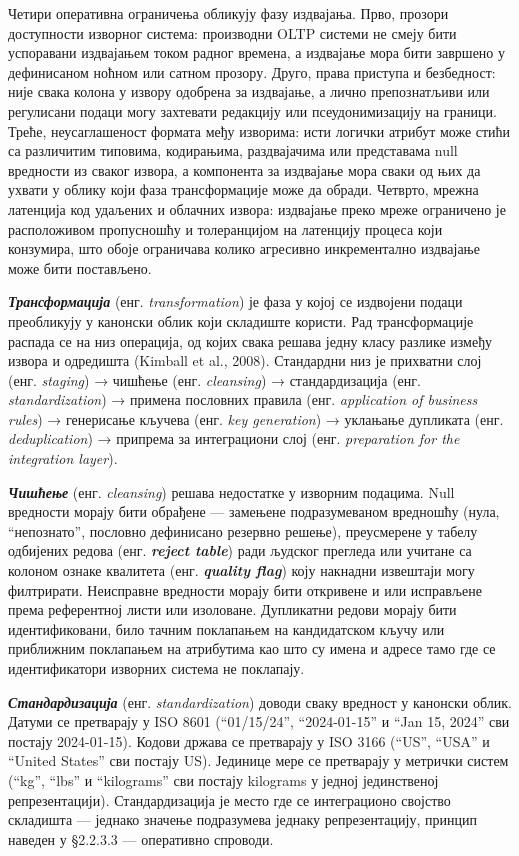 Четири оперативна ограничења обликују фазу издвајања. Прво, прозори доступности изворног система: производни OLTP системи не смеју бити успоравани издвајањем током радног времена, а издвајање мора бити завршено у дефинисаном ноћном или сатном прозору. Друго, права приступа и безбедност: није свака колона у извору одобрена за издвајање, а лично препознатљиви или регулисани подаци могу захтевати редакцију или псеудонимизацију на граници. Треће, неусаглашеност формата међу изворима: исти логички атрибут може стићи са различитим типовима, кодирањима, раздвајачима или представама null вредности из сваког извора, а компонента за издвајање мора сваки од њих да ухвати у облику који фаза трансформације може да обради. Четврто, мрежна латенција код удаљених и облачних извора: издвајање преко мреже ограничено је расположивом пропусношћу и толеранцијом на латенцију процеса који конзумира, што обоје ограничава колико агресивно инкрементално издвајање може бити постављено.

\textbf{\textit{Трансформација}} (енг. \textit{transformation}) је фаза у којој се издвојени подаци преобликују у канонски облик који складиште користи. Рад трансформације распада се на низ операција, од којих свака решава једну класу разлике између извора и одредишта (Kimball et al., 2008). Стандардни низ је прихватни слој (енг. \textit{staging}) → чишћење (енг. \textit{cleansing}) → стандардизација (енг. \textit{standardization}) → примена пословних правила (енг. \textit{application of business rules}) → генерисање кључева (енг. \textit{key generation}) → уклањање дупликата (енг. \textit{deduplication}) → припрема за интеграциони слој (енг. \textit{preparation for the integration layer}).

\textbf{\textit{Чишћење}} (енг. \textit{cleansing}) решава недостатке у изворним подацима. Null вредности морају бити обрађене — замењене подразумеваном вредношћу (нула, “непознато”, пословно дефинисано резервно решење), преусмерене у табелу одбијених редова (енг. \textbf{\textit{reject table}}) ради људског прегледа или учитане са колоном ознаке квалитета (енг. \textbf{\textit{quality flag}}) коју накнадни извештаји могу филтрирати. Неисправне вредности морају бити откривене и или исправљене према референтној листи или изоловане. Дупликатни редови морају бити идентификовани, било тачним поклапањем на кандидатском кључу или приближним поклапањем на атрибутима као што су имена и адресе тамо где се идентификатори изворних система не поклапају.

\textbf{\textit{Стандардизација}} (енг. \textit{standardization}) доводи сваку вредност у канонски облик. Датуми се претварају у ISO 8601 (“01/15/24”, “2024-01-15” и “Jan 15, 2024” сви постају 2024-01-15). Кодови држава се претварају у ISO 3166 (“US”, “USA” и “United States” сви постају US). Јединице мере се претварају у метрички систем (“kg”, “lbs” и “kilograms” сви постају kilograms у једној јединственој репрезентацији). Стандардизација је место где се интеграционо својство складишта — једнако значење подразумева једнаку репрезентацију, принцип наведен у §2.2.3.3 — оперативно спроводи.

